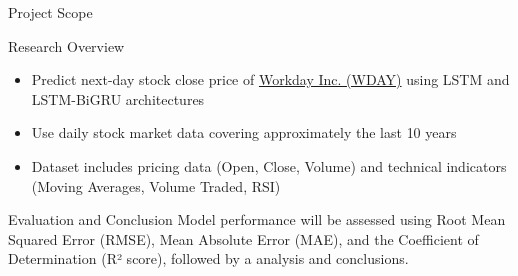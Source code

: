 \begin{frame}[label=scope]{Project Scope}

    \begin{block}{Research Overview}
        \begin{itemize}
            \item Predict \alert{next-day stock close price of 
            \href{https://www.nasdaq.com/market-activity/stocks/wday}{Workday 
            Inc. (WDAY)} using LSTM and LSTM-BiGRU architectures}
            \item Use daily stock market data covering approximately the last 
            \alert{10 years}
            \item Dataset includes pricing data (Open, Close, Volume) and 
            technical indicators (Moving Averages, Volume Traded, RSI)
        \end{itemize}
    \end{block}

    \begin{exampleblock}{Evaluation and Conclusion}
        Model performance will be assessed using Root Mean Squared Error (RMSE), Mean Absolute Error (MAE), and the Coefficient of Determination (R² score), followed by a analysis and conclusions.
    \end{exampleblock}


\end{frame}


